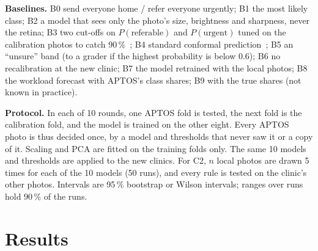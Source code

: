 \documentclass[10pt,twocolumn,letterpaper]{article}
\newcommand{\pct}{\,\%}
\begin{document}
\textbf{Baselines.} B0 send everyone home / refer everyone urgently; B1 the most likely class; B2 a model that sees only the photo's size, brightness and sharpness, never the retina; B3 two cut-offs on $P(\text{referable})$ and $P(\text{urgent})$ tuned on the calibration photos to catch 90\pct~\cite{gulshan16,abramoff16}; B4 standard conformal prediction~\cite{hasan}; B5 an ``unsure'' band (to a grader if the highest probability is below 0.6); B6 no recalibration at the new clinic; B7 the model retrained with the local photos; B8 the workload forecast with APTOS's class shares; B9 with the true shares (not known in practice).

\textbf{Protocol.} In each of 10 rounds, one APTOS fold is tested, the next fold is the calibration fold, and the model is trained on the other eight. Every APTOS photo is thus decided once, by a model and thresholds that never saw it or a copy of it. Scaling and PCA are fitted on the training folds only. The same 10 models and thresholds are applied to the new clinics. For C2, $n$ local photos are drawn 5 times for each of the 10 models (50 runs), and every rule is tested on the clinic's other photos. Intervals are 95\pct{} bootstrap or Wilson intervals; ranges over runs hold 90\pct{} of the runs.

\section{Results}\label{sec:results}
\end{document}
